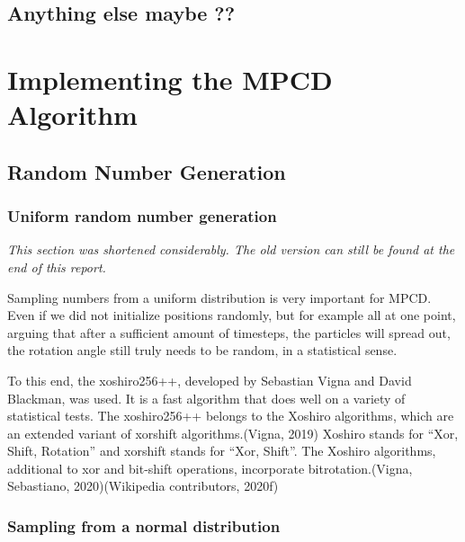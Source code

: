\documentclass[
]{article}
\begin{document}
\hypertarget{anything-else-maybe}{%
\subsection{Anything else maybe ??}\label{anything-else-maybe}}

\hypertarget{implementing-the-mpcd-algorithm}{%
\section{Implementing the MPCD
Algorithm}\label{implementing-the-mpcd-algorithm}}

\hypertarget{random-number-generation}{%
\subsection{Random Number Generation}\label{random-number-generation}}

\hypertarget{uniform-random-number-generation}{%
\subsubsection{Uniform random number
generation}\label{uniform-random-number-generation}}

\emph{This section was shortened considerably. The old version can still
be found at the end of this report.}

Sampling numbers from a uniform distribution is very important for MPCD.
Even if we did not initialize positions randomly, but for example all at
one point, arguing that after a sufficient amount of timesteps, the
particles will spread out, the rotation angle still truly needs to be
random, in a statistical sense.

To this end, the xoshiro256++, developed by Sebastian Vigna and David
Blackman, was used. It is a fast algorithm that does well on a variety
of statistical tests. The xoshiro256++ belongs to the Xoshiro
algorithms, which are an extended variant of xorshift algorithms.(Vigna,
2019) Xoshiro stands for ``Xor, Shift, Rotation'' and xorshift stands
for ``Xor, Shift''. The Xoshiro algorithms, additional to xor and
bit-shift operations, incorporate bitrotation.(Vigna, Sebastiano,
2020)(Wikipedia contributors, 2020f)

\hypertarget{sampling-from-a-normal-distribution}{%
\subsubsection{Sampling from a normal
distribution}\label{sampling-from-a-normal-distribution}}
\end{document}
